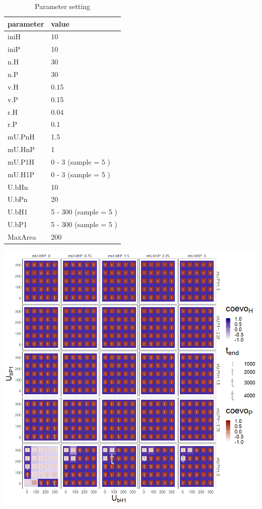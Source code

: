 \documentclass[
]{book}
\begin{document}
\begin{table}[!h]

\caption{\label{tab:4Ub1mU1tablepdf}Parameter setting}
\centering
\begin{tabular}[t]{l|l}
\hline
parameter & value\\
\hline
iniH & 10\\
\hline
iniP & 10\\
\hline
n.H & 30\\
\hline
n.P & 30\\
\hline
v.H & 0.15\\
\hline
v.P & 0.15\\
\hline
r.H & 0.04\\
\hline
r.P & 0.1\\
\hline
mU.PnH & 1.5\\
\hline
mU.HnP & 1\\
\hline
mU.P1H & 0 - 3 (sample = 5 )\\
\hline
mU.H1P & 0 - 3 (sample = 5 )\\
\hline
U.bHn & 10\\
\hline
U.bPn & 20\\
\hline
U.bH1 & 5 - 300 (sample = 5 )\\
\hline
U.bP1 & 5 - 300 (sample = 5 )\\
\hline
MaxArea & 200\\
\hline
\end{tabular}
\end{table}

\newpage

\includegraphics[width=1\linewidth]{plots/4_fourPar-U.b1-mU1_plot}
\end{document}

